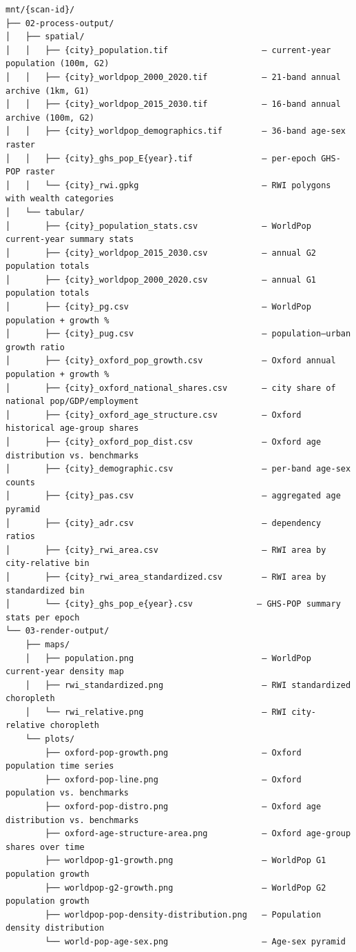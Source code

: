 \documentclass[
  letterpaper,
  DIV=11,
  numbers=noendperiod]{scrreprt}
\begin{document}
\begin{verbatim}
mnt/{scan-id}/
├── 02-process-output/
│   ├── spatial/
│   │   ├── {city}_population.tif                   — current-year population (100m, G2)
│   │   ├── {city}_worldpop_2000_2020.tif           — 21-band annual archive (1km, G1)
│   │   ├── {city}_worldpop_2015_2030.tif           — 16-band annual archive (100m, G2)
│   │   ├── {city}_worldpop_demographics.tif        — 36-band age-sex raster
│   │   ├── {city}_ghs_pop_E{year}.tif              — per-epoch GHS-POP raster
│   │   └── {city}_rwi.gpkg                         — RWI polygons with wealth categories
│   └── tabular/
│       ├── {city}_population_stats.csv             — WorldPop current-year summary stats
│       ├── {city}_worldpop_2015_2030.csv           — annual G2 population totals
│       ├── {city}_worldpop_2000_2020.csv           — annual G1 population totals
│       ├── {city}_pg.csv                           — WorldPop population + growth %
│       ├── {city}_pug.csv                          — population–urban growth ratio
│       ├── {city}_oxford_pop_growth.csv            — Oxford annual population + growth %
│       ├── {city}_oxford_national_shares.csv       — city share of national pop/GDP/employment
│       ├── {city}_oxford_age_structure.csv         — Oxford historical age-group shares
│       ├── {city}_oxford_pop_dist.csv              — Oxford age distribution vs. benchmarks
│       ├── {city}_demographic.csv                  — per-band age-sex counts
│       ├── {city}_pas.csv                          — aggregated age pyramid
│       ├── {city}_adr.csv                          — dependency ratios
│       ├── {city}_rwi_area.csv                     — RWI area by city-relative bin
│       ├── {city}_rwi_area_standardized.csv        — RWI area by standardized bin
│       └── {city}_ghs_pop_e{year}.csv             — GHS-POP summary stats per epoch
└── 03-render-output/
    ├── maps/
    │   ├── population.png                          — WorldPop current-year density map
    │   ├── rwi_standardized.png                    — RWI standardized choropleth
    │   └── rwi_relative.png                        — RWI city-relative choropleth
    └── plots/
        ├── oxford-pop-growth.png                   — Oxford population time series
        ├── oxford-pop-line.png                     — Oxford population vs. benchmarks
        ├── oxford-pop-distro.png                   — Oxford age distribution vs. benchmarks
        ├── oxford-age-structure-area.png           — Oxford age-group shares over time
        ├── worldpop-g1-growth.png                  — WorldPop G1 population growth
        ├── worldpop-g2-growth.png                  — WorldPop G2 population growth
        ├── worldpop-pop-density-distribution.png   — Population density distribution
        └── world-pop-age-sex.png                   — Age-sex pyramid
\end{verbatim}
\end{document}
